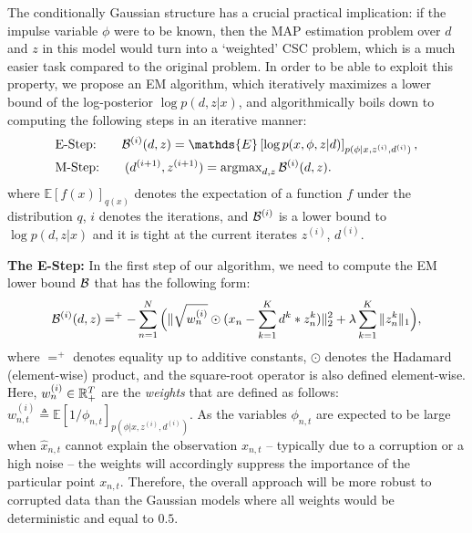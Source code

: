 The conditionally Gaussian structure has a crucial practical implication: if the impulse variable $\phi$ were to be known, then the \ac{MAP} estimation problem over $d$ and $z$ in this model would turn into a `weighted' \ac{CSC} problem, which is a much easier task compared to the original problem. In order to be able to exploit this property, we propose an \ac{EM} algorithm, which iteratively maximizes a lower bound of the log-posterior $\log p(d,z|x)$, and algorithmically boils down to computing the following steps in an iterative manner:
\begin{align}
&\text{E-Step:} \hspace{20pt} {\cal B}^{(i)}(d,z) = \mathds{E}\left[\log p(x,\phi,z|d)\right]_{p(\phi|x,z^{(i)},d^{(i)})}, \\
&\text{M-Step:} \hspace{20pt} (d^{(i+1)}, z^{(i+1)}) = \argmax\nolimits_{d,z} {\cal B}^{(i)}(d,z). \label{eq:mstep}
\end{align}
where $\mathds{E}[f(x)]_{q(x)}$ denotes the expectation of a function $f$ under the distribution $q$, $i$ denotes the iterations, and ${\cal B}^{(i)}$ is a lower bound to $\log p(d,z|x)$ and it is tight at the current iterates $z^{(i)}$, $d^{(i)}$.



%

%

\textbf{The E-Step:} 
In the first step of our algorithm, we need to compute the \ac{EM} lower bound ${\cal B}$ that has the following form:
\begin{align}
{\cal B}^{(i)}(d,z) =^+ - \sum_{n=1}^N \Big( \|\sqrt{w_{n}^{(i)}} \odot (x_{n} - \sum_{k=1}^{K}d^{k} * z_{n}^{k})\|_{2}^{2} + \lambda \sum_{k=1}^K{\|z_{n}^{k}\|_1}\Big),
\end{align}
where $=^+$ denotes equality up to additive constants, $\odot$ denotes the Hadamard (element-wise) product, and the square-root operator is also defined element-wise. Here, $w_{n}^{(i)} \in \mathbb{R}^T_+$ are the \emph{weights} that are defined as follows: $w_{n,t}^{(i)} \triangleq \mathds{E}\left[1/{\phi_{n,t}}\right]_{p(\phi|x,z^{(i)},d^{(i)})}$. As the variables $\phi_{n,t}$ are expected to be large when $\hat{x}_{n,t}$ cannot explain the observation $x_{n,t}$ -- typically due to a corruption or a high noise -- the weights will accordingly suppress the importance of the particular point $x_{n,t}$. Therefore, the overall approach will be more robust to corrupted data than the Gaussian models where all weights would be deterministic and equal to $0.5$. 

